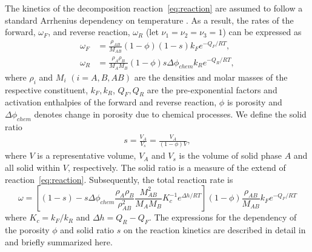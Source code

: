 \documentclass[]{scrreprt}
\begin{document}
The kinetics of the decomposition reaction~\eqref{eq:reaction} are assumed
to follow a standard Arrhenius dependency on temperature 
\citep{Poulet2014}. As a result, the rates of the forward, $\omega_F$, and
reverse reaction, $\omega_R$ (let $\nu_1=\nu_2=\nu_3=1$) can
be expressed as \citep{Alevizos2014}
\begin{subequations}
\label{eq:reaction_rates_txt}
\begin{align}
  \omega_F &=  \frac{\rho_{AB}}{M_{AB}} (1 - \phi)(1 - s)  k_F e^{-Q_F/RT}, \\
  \omega_R &=  \frac{\rho_{A} \rho_{B}}{M_A M_B} (1 - \phi) s \Delta\phi_{chem}
  k_R e^{-Q_R/RT},
\end{align}
\end{subequations}
where $\rho_i$ and $M_i$ $(i = A, B, AB)$ are the densities and molar masses of
the respective constituent,
$k_F,k_R$, $Q_F,Q_R$ are the pre-exponential factors and activation enthalpies
of the forward and reverse reaction,
$\phi$ is porosity and $\Delta\phi_{chem}$ denotes change in porosity due to 
chemical processes. We define the solid ratio
\begin{eqnarray}
    \label{eq:s}
    s = \frac{V_{A}}{V_s} = \frac{V_{A}}{(1-\phi) V},
\end{eqnarray}
where $V$ is a representative volume, $V_A$ and $V_s$ is the volume of solid
phase $A$ and all solid within $V$, respectively. The solid ratio is a measure
of the extend of reaction~\eqref{eq:reaction}. Subsequently, the total
reaction rate is
\begin{equation}
 \label{eq:reaction_rate_total}
\omega = \left[(1 - s) - s  \Delta \phi_{chem} \frac{\rho_{A}
\rho_{B}}{\rho^2_{AB}} \frac{M^2_{AB}}{M_A M_B} K^{-1}_c e^{\Delta h/RT}
\right] (1 - \phi) \frac{\rho_{AB}}{M_{AB}} k_F e^{-Q_F/RT}
\end{equation}
where $K_c = k_F/k_R$ and $\Delta h = Q_R - Q_F$.  The expressions for the
dependency of the porosity $\phi$ and solid ratio $s$ on the reaction kinetics
are described in detail in \cite{Alevizos2014} and briefly summarized here.
\end{document}
